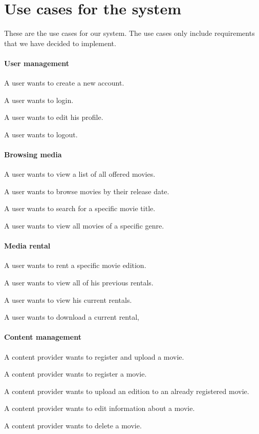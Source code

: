\section{Use cases for the system}
\label{Requirements_UC}
These are the use cases for our system. The use cases only include requirements that we have decided to implement.
\paragraph{User management}
\begin{my_itemize}
	\item A user wants to create a new account.
	\item A user wants to login.
	\item A user wants to edit his profile.
	\item A user wants to logout.
\end{my_itemize}

\paragraph{Browsing media}
\begin{my_itemize}
	\item A user wants to view a list of all offered movies.
	\item A user wants to browse movies by their release date.
	\item A user wants to search for a specific movie title.
	\item A user wants to view all movies of a specific genre.
\end{my_itemize}

\paragraph{Media rental}
\begin{my_itemize}
	\item A user wants to rent a specific movie edition.
	\item A user wants to view all of his previous rentals.
	\item A user wants to view his current rentals.
	\item A user wants to download a current rental,
\end{my_itemize}

\paragraph{Content management}
\begin{my_itemize}
	\item A content provider wants to register and upload a movie.
	\item A content provider wants to register a movie.
	\item A content provider wants to upload an edition to an already registered movie.
	\item A content provider wants to edit information about a movie.
	\item A content provider wants to delete a movie.
\end{my_itemize}